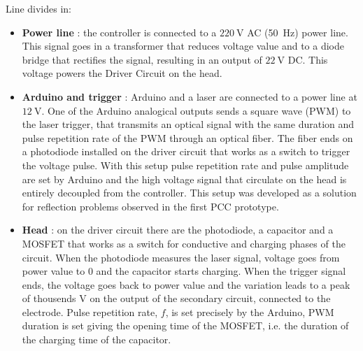 Line divides in:
\begin{itemize}
 \item \textbf{Power line} : the controller is connected to a $\SI{220}{\volt}$ AC (\SI{50}{\hertz}) power line. This signal goes in a transformer that reduces voltage value and to a diode bridge that rectifies the signal, resulting in an output of $\SI{22}{\volt}$ DC. This voltage powers the Driver Circuit on the head.
 \item \textbf{Arduino and trigger} : Arduino and a laser are connected to a power line at $\SI{12}{\volt}$. One of the Arduino analogical outputs sends a square wave (PWM) to the laser trigger, that transmits an optical signal with the same duration and pulse repetition rate of the PWM through an optical fiber. The fiber ends on a photodiode installed on the driver circuit that works as a switch to trigger the voltage pulse. With this setup pulse repetition rate and pulse amplitude are set by Arduino and the high voltage signal that circulate on the head is entirely decoupled from the controller. This setup was developed as a solution for reflection problems observed in the first PCC prototype.
 \item \textbf{Head} : on the driver circuit there are the photodiode, a capacitor and a MOSFET that works as a switch for conductive and charging phases of the circuit. When the photodiode measures the laser signal, voltage goes from power value to \num{0} and the capacitor starts charging. When the trigger signal ends, the voltage goes back to power value and the variation leads to a peak of thousends $\si{\volt}$ on the output of the secondary circuit, connected to the electrode. Pulse repetition rate, $f$, is set precisely by the Arduino, PWM duration is set giving the opening time of the MOSFET, i.e. the duration of the charging time of the capacitor. 
\end{itemize}

